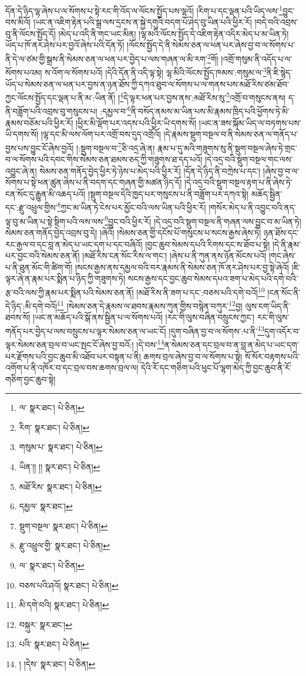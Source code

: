 དོན་དེ་ཉིད་ལྷ་ཞེས་པ་ལ་སོགས་པ་སྟེ་རང་གི་འོད་ལ་ལོངས་སྤྱོད་པས་ལྷའོ། །རིག་པ་དང་ལྡན་པའི་ཡིད་ལས་\footnote{ལ་  སྣར་ཐང་།  པེ་ཅིན། }བྱུང་བས་མིའོ། །ཡང་ན་འཇིག་རྟེན་པའི་སྒྲ་ལས་དྲངས་ན་སྐྱེ་དགུའི་བདག་པོ་ཤེད་བུ་ཡིན་པའི་ཕྱིར་རོ། །བདེ་བའི་འབྲས་བུ་ནི་ལོངས་སྤྱོད་དོ། །མེད་པ་འདི་ནི་གང་ཡང་མིན། །ལྷ་མའི་ལོངས་སྤྱོད་དེ་འཇིག་རྟེན་འདིར་མེད་པ་མ་ཡིན་ཏེ། ཡོད་པ་ཁོ་ནར་ཤེས་པར་བྱའོ་ཞེས་པའི་དོན་ཏོ། །ལོངས་སྤྱོད་དེ་ནི་སེམས་ཅན་ལ་ཕན་པར་ཞེས་བྱ་བ་ལ་སོགས་པ་ནི་དེ་ལ་ཙམ་གྱི་སྒྲས་ནི་སེམས་ཅན་ལ་ཕན་པར་བྱེད་པ་ལས་གཞན་ལ་མི་རག་\footnote{རིག་  སྣར་ཐང་།  པེ་ཅིན། }གོ། །འགྲོ་གསུམ་ནི་འདོད་པ་ལ་སོགས་པའམ། ས་འོག་ལ་སོགས་པའོ། །དེའི་དོན་ནི་འདི་ལྟ་སྟེ། ལྷ་མིའི་ལོངས་སྤྱོད་ཁམས་:གསུམ་ལ་\footnote{གསུམ་པ་  སྣར་ཐང་།  པེ་ཅིན། }ནི་ཇི་སྙེད་ཡོད་པ་སེམས་ཅན་ལ་ཕན་པར་བྱས་ན་ཉན་ཐོས་ཀྱི་དཀའ་ཐུབ་ལ་སོགས་པ་ལ་གནས་པས་མཐོ་རིས་ཙམ་ཐོབ་ཀྱང་ལོངས་སྤྱོད་དང་ལྡན་པ་ནི་མ་:ཡིན་ནོ། །\footnote{ཡིན་།། །།  སྣར་ཐང་།  པེ་ཅིན། }དེ་ལྟར་ཕན་པར་བྱས་ནས་:མཐོ་རིས་སུ་\footnote{མཐོ་རིས་  སྣར་ཐང་།  པེ་ཅིན། }འགྲོ་བ་གསུངས་ནས། ད་ནི་བཟློག་པའི་འབྲས་བུ་གསུངས་པ། :དམྱལ་བ་\footnote{དམྱལ་  སྣར་ཐང་། }ནི་བསོད་ནམས་མ་ཡིན་པས་མི་རྣམས་ཁྲིད་པའི་ཕྱོགས་ཏེ་མི་རྣམས་བཅོམ་པའི་ཕྱིར་རོ། །ཕྱིར་མི་ལྡོག་པར་འདས་པའི་ཕྱིར་ཡི་དགས་སོ། །ཡང་ན་ཟས་སྐོམ་ཡིད་ལ་བཏགས་པས་ཡི་དགས་སོ། །ལྷ་དང་མི་ལས་ལོག་པར་འགྲོ་བས་དུད་འགྲོའོ། །དེ་རྣམས་སྡུག་བསྔལ་བ་ནི་སེམས་ཅན་ལ་གནོད་པ་བྱས་པས་བྱུང་ངོ་ཞེས་བྱའོ། །:སྡུག་བསྔལ་བ་\footnote{སྡུག་བསྔལ་  སྣར་ཐང་།  པེ་ཅིན། }ཅི་འདྲ་ཞེ་ན། རྣམ་པ་དུ་མའི་གཟུགས་སུ་ནི་སྡུག་བསྔལ་ཞེས་ཏེ་གྲང་བ་ལ་སོགས་པའི་དབང་གིས་སེམས་ཅན་ཐམས་ཅད་ཀྱི་གཟུགས་ཐ་དད་པའོ། །དེ་འདྲ་བའི་སྡུག་བསྔལ་གང་ལས་འབྱུང་ཞེ་ན། སེམས་ཅན་གནོད་བྱེད་ཕྱིར་ཏེ་ཉེས་པ་མེད་པའི་ཕྱིར་རོ། །དོན་དེ་ཉིད་ནི་བཀྲེས་པ་དང་། །ཞེས་བྱ་བ་ལ་སོགས་པ་སྟེ་ཕན་ཚུན་ཞེས་པ་ནི་བདག་དང་གཞན་གྱི་མཚན་ཉིད་དོ། །དེ་འདྲ་བའི་སྡུག་བསྔལ་རྟག་པ་ནི་ཞེས་ཏེ་ངན་སོང་དུ་རྒྱུན་མི་འཆད་པའོ། །སྡུག་བསྔལ་དེའི་ཁྱད་པར་གསུངས་པ་ནི་བཟློག་པར་དཀའ་སྟེ། མཆོད་སྦྱིན་དང་:རྫུ་འཕྲུལ་གྱིས་\footnote{རྫུ་འཕྲུལ་གྱི་  སྣར་ཐང་།  པེ་ཅིན། }ཀྱང་མ་ཡིན་ཏེ་ངེས་པར་མྱོང་བའི་ལས་ཡིན་པའི་ཕྱིར་རོ། །གསོར་མེད་པ་ནི་འབྱུང་བའི་ནད་ལྟ་བུ་མ་ཡིན་པ་སྟེ་སྡིག་པའི་ལས་ལས་\footnote{ལ་  སྣར་ཐང་།  པེ་ཅིན། }བྱུང་བའི་ཕྱིར་རོ། །དེ་འདྲ་བའི་སྡུག་བསྔལ་ནི་གཞན་ལས་བྱུང་བ་མ་ཡིན་ཏེ། སེམས་ཅན་གནོད་བྱེད་འབྲས་བུ་དེ། །ཞེའོ། །སེམས་ཅན་གྱི་དངོས་པོ་གསུངས་པ་སངས་རྒྱས་ཞེས་ཏེ། ཉན་ཐོས་དང་རང་རྒྱལ་བ་དང་བླ་ན་མེད་པ་ཡང་དག་པ་དང་བཞིའོ། །བྱང་ཆུབ་སེམས་དཔའི་རིགས་དང་ས་ཐོབ་པ་སྟེ། །དེ་ནི་རྣམ་པར་བྱང་བའི་སེམས་ཅན་ནོ། །མཐོ་རིས་ངན་སོང་རིས་ལ་གང་། །ཞེས་པ་ནི་ཀུན་ནས་ཉོན་མོངས་པའོ། །གང་ཞེས་པ་ནི་ཐུན་མོང་གི་ཚིག་གོ། །སངས་རྒྱས་ནས་དམྱལ་བའི་བར་རྣམས་ནི་སེམས་ཅན་ཁོ་ནར་ཤེས་པར་བྱ་སྟེ་ཞེའོ། །ཇི་ལྟར་ཞེ་ན་རྣམ་པར་སྨིན་པ་ཉིད་ཀྱི་གཟུགས་ཏེ། སངས་རྒྱས་དང་བྱང་ཆུབ་སེམས་དཔའ་ཟག་པ་མེད་པའི་དགེ་བའི་རྩ་བའི་ལས་ཀྱི་རྣམ་པར་སྨིན་པའི་སེམས་ཅན་ནོ། །མཐོ་རིས་ནི་ཟག་པ་དང་:བཅས་པའི་དགེ་བའོ།\footnote{བཅས་པའི་ཤའོ།  སྣར་ཐང་།  པེ་ཅིན། } །ངན་སོང་ནི་དེ་ཉིད་:མི་དགེ་བའོ།\footnote{མི་དགེ་བའི།  སྣར་ཐང་།  པེ་ཅིན། } །སེམས་ཅན་དེ་རྣམས་ལ་ཐབས་རྣམས་ཀུན་གྱིས་བསྙེན་བཀུར་\footnote{བསྐུར་  སྣར་ཐང་། }བྱ། ལུས་ངག་ཡིད་ནི་ཐབས་སོ། །ཡང་ན་མཆོད་པའི་སྒོ་ནས་སྦྱིན་པ་ལ་སོགས་པའོ། །རང་གི་ལུས་བཞིན་བསྲུངས་ཀྱང་། རང་གི་ལུས་གནོད་པར་བྱེད་པ་ལས་བསྲུངས་པ་ལྟར་སེམས་ཅན་ལ་ཡང་ངོ། །དུག་བཞིན་བྱ་བ་ལ་སོགས་:པ་ནི་\footnote{པའི་  སྣར་ཐང་།  པེ་ཅིན། }དུག་འདོར་བ་ལྟར་སེམས་ཅན་བྲལ་བ་ཡང་སྤང་ངོ་ཞེས་བྱ་བའོ:། །དེ་བས་\footnote{། །དེས་  སྣར་ཐང་།  པེ་ཅིན། }ན་སེམས་ཅན་དང་བྲལ་བ་ན་བླ་ན་མེད་པ་ཡང་དག་པར་རྫོགས་པའི་བྱང་ཆུབ་མི་འཐོབ་པར་བསྟན་པ་ནི། ཆགས་བྲལ་ཞེས་བྱ་བ་ལ་སོགས་པ་སྟེ། སོ་སོར་བརྟགས་པའི་འགོག་པ་ནི་འཁོར་བ་དང་བྲལ་བས་ཆགས་བྲལ་ལ། དེའི་རོ་དང་གཅིག་པའི་ཕུང་པོ་ལྷག་མེད་ཀྱི་བྱང་ཆུབ་ནི་རོ་གཅིག་བྱང་ཆུབ་སྟེ། 